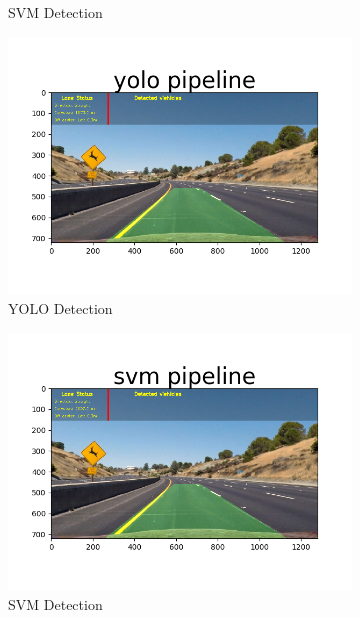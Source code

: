 \documentclass[conference]{IEEEtran}
\begin{document}
\begin{figure}[h]
\begin{subfigure}[t]{0.2\textwidth}
		\caption{SVM Detection}
	\end{subfigure} 
	\begin{subfigure}[t]{0.2\textwidth} 
		\centering
		\includegraphics[scale=0.2]{figures/yolo_test_03.png}
		\caption{YOLO Detection}
	\end{subfigure}%
	\begin{subfigure}[t]{0.2\textwidth} 
		\centering
		\includegraphics[scale=0.2]{figures/svm_test_03.png}
		\caption{SVM Detection}
	\end{subfigure} 
	\begin{subfigure}[t]{0.2\textwidth} 
		\centering

\end{subfigure}
\end{figure}
\end{document}
